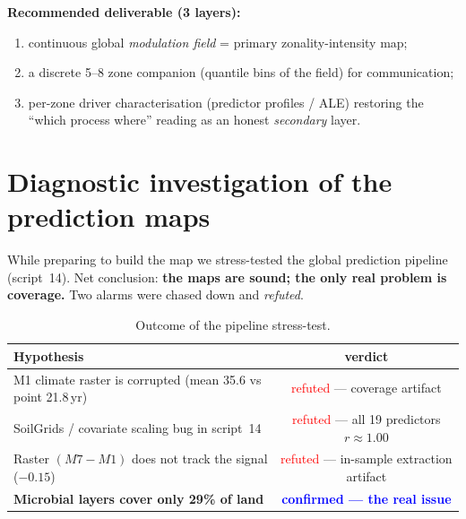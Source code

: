 \documentclass[11pt,a4paper]{article}
\begin{document}
\noindent\textbf{Recommended deliverable (3 layers):}
\begin{enumerate}[nosep]
  \item continuous global \emph{modulation field} = primary zonality-intensity map;
  \item a discrete 5--8 zone companion (quantile bins of the field) for communication;
  \item per-zone driver characterisation (predictor profiles / ALE) restoring the
        ``which process where'' reading as an honest \emph{secondary} layer.
\end{enumerate}

\section{Diagnostic investigation of the prediction maps}

While preparing to build the map we stress-tested the global prediction pipeline
(script~14). Net conclusion: \textbf{the maps are sound; the only real problem is
coverage.} Two alarms were chased down and \emph{refuted}.

\begin{table}[h]
\centering
\begin{tabular}{lc}
\toprule
Hypothesis & verdict\\
\midrule
M1 climate raster is corrupted (mean 35.6 vs point 21.8\,yr) & \textcolor{red}{refuted} --- coverage artifact\\
SoilGrids / covariate scaling bug in script~14 & \textcolor{red}{refuted} --- all 19 predictors $r\!\approx\!1.00$\\
Raster $(M7-M1)$ does not track the signal ($-0.15$) & \textcolor{red}{refuted} --- in-sample extraction artifact\\
\textbf{Microbial layers cover only 29\% of land} & \textcolor{blue}{\textbf{confirmed --- the real issue}}\\
\bottomrule
\end{tabular}
\caption{Outcome of the pipeline stress-test.}
\end{table}
\end{document}
